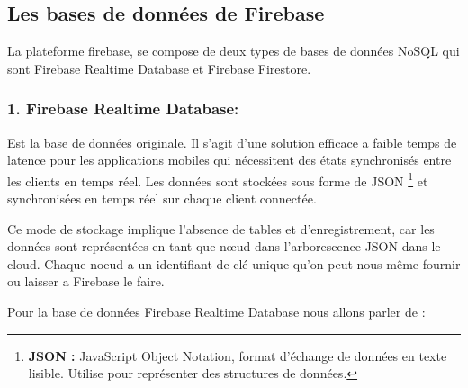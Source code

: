 \subsection{Les bases de données de Firebase}
La plateforme firebase, se compose de deux types de bases de données NoSQL qui sont Firebase Realtime Database et Firebase Firestore.

\subsubsection{1. Firebase Realtime Database:}

Est la base de données originale. Il s'agit d'une solution efficace a faible temps de latence pour les applications mobiles qui nécessitent des états synchronisés entre les clients en temps réel. Les données sont stockées sous forme de JSON \footnote{\textbf{JSON :} JavaScript Object Notation, format d'échange de données en texte lisible. Utilise pour représenter des structures de données.} et synchronisées en temps réel sur chaque client connectée.

Ce mode de stockage implique l'absence de tables et d'enregistrement, car les données sont représentées en tant que nœud dans l'arborescence JSON dans le cloud. Chaque noeud a un identifiant de clé unique qu'on peut nous même fournir ou laisser a Firebase le faire.

Pour la base de données Firebase Realtime Database nous allons parler de :

